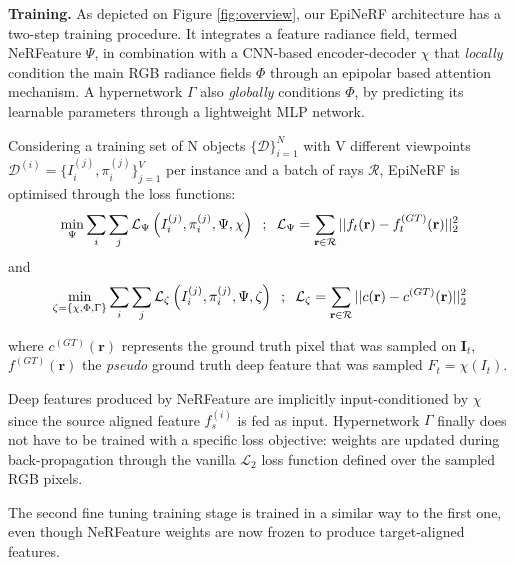 \noindent\textbf{Training.} As depicted on Figure \ref{fig:overview}, our EpiNeRF architecture has a two-step training procedure. It integrates a feature radiance field, termed NeRFeature $\Psi$, in combination with a CNN-based encoder-decoder $\chi$ that \textit{locally} condition the main RGB radiance fields $\Phi$ through an epipolar based attention mechanism. A hypernetwork $\Gamma$ also \textit{globally} conditions $\Phi$, by predicting its learnable parameters through a lightweight MLP network. 

Considering a training set of N objects $\{\mathcal{D}\}_{i=1}^{N}$ with V different viewpoints $\mathcal{D}^{(i)} = \{I_{i}^{(j)},\pi_{i}^{(j)}\}_{j=1}^{V}$ per instance and a batch of rays $\mathcal{R}$, EpiNeRF is optimised through the loss functions: 
\begin{equation}
 \min_{\Psi} \sum_{i}\sum_{j}\mathcal{L}_{\Psi}\left(I_{i}^{(j)},\pi_{i}^{(j)},\Psi,\chi \right) \hspace{.2cm} ; \hspace{.2cm}\mathcal{L}_{\Psi}= \sum_{\mathbf{r}\in\mathcal{R}} || f_{t}(\mathbf{r}) - f_{t}^{(GT)}(\mathbf{r}) ||_{2}^{2}
\end{equation}
and 
\begin{equation}
 \min_{\zeta=\{\chi,\Phi,\Gamma\}}\sum_{i}\sum_{j}\mathcal{L}_{\zeta}\left(I_{i}^{(j)},\pi_{i}^{(j)},\Psi,\zeta \right)\hspace{.2cm}  ; \hspace{.2cm}\mathcal{L}_{\zeta}= \sum_{\mathbf{r}\in\mathcal{R}} || c(\mathbf{r}) - c^{(GT)}(\mathbf{r}) ||_{2}^{2}
\end{equation}


where $c^{(GT)}(\mathbf{r})$ represents the ground truth pixel that was sampled on $\mathbf{I}_{t}$, $f^{(GT)}(\mathbf{r})$ the \textit{pseudo} ground truth deep feature that was sampled $F_{t}=\chi(I_{t})$.
\newline

Deep features produced by NeRFeature are implicitly input-conditioned by $\chi$ since the source aligned feature $f_s^{(i)}$ is fed as input. Hypernetwork $\Gamma$ finally does not have to be trained with a specific loss objective: weights are updated during back-propagation through the vanilla $\mathcal{L}_{2}$ loss function defined over the sampled RGB pixels. 

The second fine tuning training stage is trained in a similar way to the first one, even though NeRFeature weights are now frozen to produce target-aligned features. 

